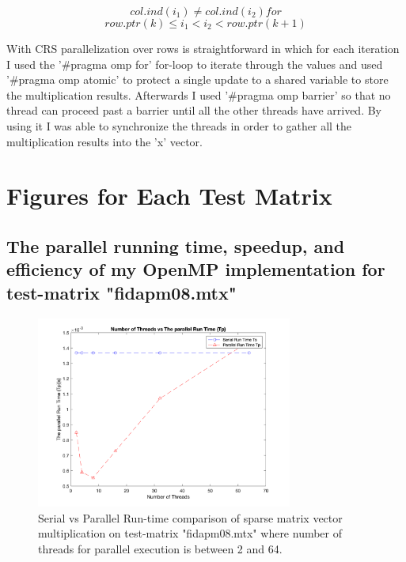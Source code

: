 \documentclass[a4paper,11pt]{article}
\theoremstyle{mytheor}
\begin{document}
\begin{equation}
col.ind(i_1) \neq col.ind(i_2) for
\end{equation}
\begin{equation}
row.ptr(k) \leq i_1 <  i_2 < row.ptr(k+1)
\end{equation}

With CRS parallelization over rows is straightforward in which for each iteration I used the '\#pragma omp for' for-loop to iterate through the values and used '\#pragma omp atomic' to protect a single update to a shared variable to store the multiplication results. Afterwards I used '\#pragma omp barrier' so that no thread can proceed past a barrier until all the other threads have arrived. By using it I was able to synchronize the threads in order to gather all the multiplication results into the 'x' vector.

\section{Figures for Each Test Matrix}
\subsection{The parallel running time, speedup, and efficiency of my OpenMP implementation for test-matrix "fidapm08.mtx"}

\begin{figure}[!htb]
    \centering
    \includegraphics[width=0.75\textwidth]{f1}
    \caption{Serial vs Parallel Run-time comparison of sparse matrix vector multiplication on test-matrix "fidapm08.mtx" where number of threads for parallel execution is between 2 and 64.}
\end{figure}
\end{document}
